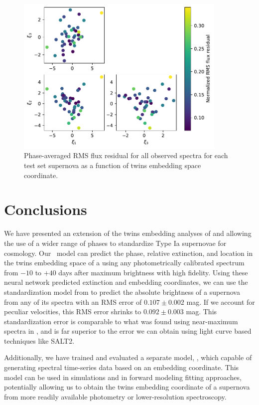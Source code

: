 \begin{figure}
    \centering
    \includegraphics[width=0.9\textwidth]{figures/nn_twins/embed2spec_rms_embedding.pdf}
    \caption{Phase-averaged RMS flux residual for all observed spectra for each test set supernova as a function of twins embedding space coordinate.}
    \label{fig:e2s_embedding_resids}
\end{figure}

\section{Conclusions} \label{sec:nn_twins_conclusions}
We have presented an extension of the twins embedding analyses of  and  allowing the use of a wider range of phases to standardize Type Ia supernovae for cosmology. Our \stoe~model can predict the phase, relative extinction, and location in the twins embedding space of a \sn using any photometrically calibrated spectrum from $-10$ to $+40$ days after maximum brightness with high fidelity. Using these neural network predicted extinction and embedding coordinates, we can use the standardization model from  to predict the absolute brightness of a supernova from any of its spectra with an RMS error of $0.107 \pm 0.002$ mag. If we account for peculiar velocities, this RMS error shrinks to $0.092 \pm 0.003$ mag. This standardization error is comparable to what was found using near-maximum spectra in , and is far superior to the error we can obtain using light curve based techniques like SALT2.

Additionally, we have trained and evaluated a separate model, \etos, which capable of generating spectral time-series data based on an embedding coordinate. This model can be used in simulations and in forward modeling fitting approaches, potentially allowing us to obtain the twins embedding coordinate of a supernova from more readily available photometry or lower-resolution spectroscopy.

